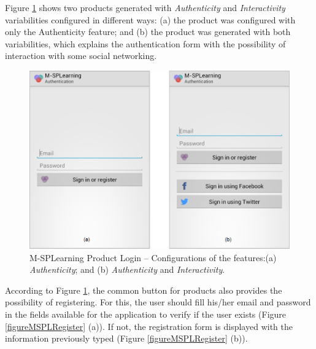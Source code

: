 Figure \ref{figureMSPLLogin} shows two products generated with \textit{Authenticity} and \textit{Interactivity} variabilities configured in different ways: (a) the product was configured with only the Authenticity feature; and (b) the product was generated with both variabilities, which explains the authentication form with the possibility of interaction with some social networking.

\begin{figure}
\centering
\includegraphics[scale=0.33]{figures/section3/MSPLLogin}
\caption{M-SPLearning Product Login -- Configurations of the features:\newline(a) \textit{Authenticity}; and (b) \textit{Authenticity} and \textit{Interactivity}.}
\label{figureMSPLLogin}
\end{figure}

According to Figure \ref{figureMSPLLogin}, the common button for products also provides the possibility of registering. For this, the user should fill his/her email and password in the fields available for the application to verify if the user exists (Figure \ref{figureMSPLRegister} (a)). If not, the registration form is displayed with the information previously typed (Figure \ref{figureMSPLRegister} (b)).


